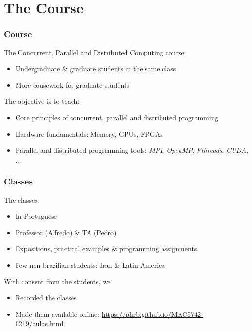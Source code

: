 \documentclass[10pt, compress, aspectratio=169]{beamer}
\begin{document}
\section{The Course}

\begin{frame}
    \frametitle{Course}
    The Concurrent, Parallel and Distributed Computing course:

    \begin{itemize}
        \item Undergraduate \& graduate students in the same class
        \item More cousework for graduate students
    \end{itemize}

    The objective is to teach:

    \begin{itemize}
        \item Core principles of concurrent, parallel and distributed programming
        \item Hardware fundamentals: Memory, GPUs, FPGAs
        \item Parallel and distributed programming tools: \textit{MPI}, \textit{OpenMP}, \textit{Pthreads},
            \textit{CUDA}, $\dots$
    \end{itemize}
\end{frame}

\begin{frame}
    \frametitle{Classes}
    The classes:

    \begin{itemize}
        \item In Portuguese
        \item Professor (Alfredo) \& TA (Pedro)
        \item Expositions, practical examples \& programming assignments
        \item Few non-brazilian students: Iran \& Latin America
    \end{itemize}

    With consent from the students, we

    \begin{itemize}
        \item Recorded the classes
        \item Made them available online:
            \url{https://phrb.github.io/MAC5742-0219/aulas.html}
    \end{itemize}
\end{frame}
\end{document}
